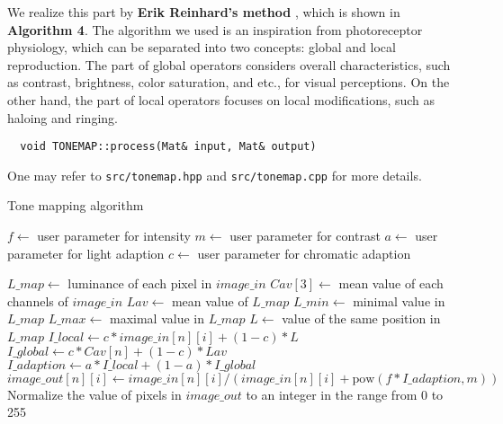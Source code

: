We realize this part by \textbf{Erik Reinhard's method} \cite{ref:tone-map}, which is shown in \textbf{Algorithm 4}. The algorithm we used is an inspiration from photoreceptor physiology, which can be separated into two concepts: global and local reproduction. The part of global operators considers overall characteristics, such as contrast, brightness, color saturation, and etc., for visual perceptions. On the other hand, the part of local operators focuses on local modifications, such as haloing and ringing.
\begin{lstlisting}
  void TONEMAP::process(Mat& input, Mat& output)
\end{lstlisting}
One may refer to \texttt{src/tonemap.hpp} and \texttt{src/tonemap.cpp} for more details.

\begin{algorithm}
\caption{Tone mapping algorithm \cite{ref:tone-map}}\label{euclid}
\begin{algorithmic}[1]
\State $f\gets$ user parameter for intensity
\State $m\gets$ user parameter for contrast
\State $a\gets$ user parameter for light adaption 
\State $c\gets$ user parameter for chromatic adaption
\end{algorithmic}
\end{algorithm}

\begin{algorithm}
\begin{algorithmic}[1]
\State $L\_map\gets$ luminance of each pixel in $image\_in$
\State $Cav[3]\gets$ mean value of each channels of $image\_in$
\State $Lav\gets$ mean value of $L\_map$
\State $L\_min\gets$ minimal value in $L\_map$
\State $L\_max\gets$ maximal value in $L\_map$
\State $L\gets$ value of the same position in $L\_map$
\State $I\_local\gets c* image\_in[n][i]+ (1-c)*L$
\State $I\_global\gets c*Cav[n]+ (1-c)* Lav$
\State $I\_adaption\gets a*I\_local+(1-a)*I\_global$
\State $image\_out[n][i]\gets image\_in[n][i]/(image\_in[n][i]+\mbox{pow}(f*I\_adaption, m))$
\EndFor
\EndFor
\State Normalize the value of pixels in $image\_out$ to an integer in the range from 0 to 255
\EndFunction
\end{algorithmic}
\end{algorithm}



